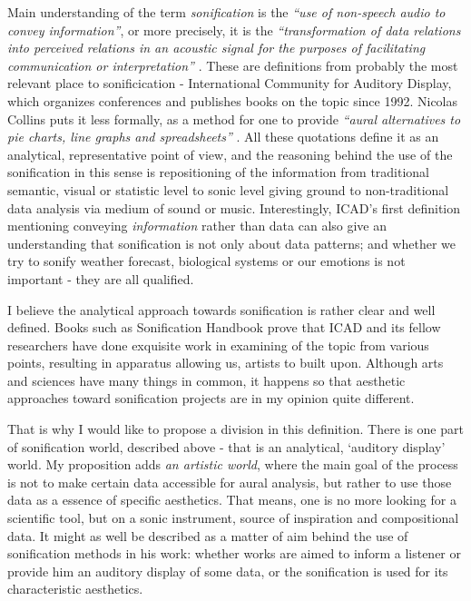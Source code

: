 \documentclass[12pt,a4paper,oneside]{report}
\begin{document}
Main understanding of the term \emph{sonification} is the \emph{``use of non-speech audio to convey information''}, or more precisely, it is the \emph{``transformation of data relations into perceived relations in an acoustic signal for the purposes of facilitating communication or interpretation''} \cite[p.~1]{Fitch}. These are definitions from probably the most relevant place to sonificication - International Community for Auditory Display, which organizes conferences and publishes books on the topic since 1992. Nicolas Collins puts it less formally, as a method for one to provide \emph{``aural alternatives to pie charts, line graphs and spreadsheets''} \cite[p.~7]{Collins2006}. All these quotations define it as an analytical, representative point of view, and the reasoning behind the use of the sonification in this sense is repositioning of the information from traditional semantic, visual or statistic level to sonic level giving ground to non-traditional data analysis via medium of sound or music. Interestingly, ICAD's first definition mentioning conveying \emph{information} rather than data can also give an understanding that sonification is not only about data patterns; and whether we try to sonify weather forecast, biological systems or our emotions is not important - they are all qualified.

I believe the analytical approach towards sonification is rather clear and well defined. Books such as Sonification Handbook \cite{Hermann2011} prove that ICAD and its fellow researchers have done exquisite work in examining of the topic from various points, resulting in apparatus allowing us, artists to built upon. Although arts and sciences have many things in common, it happens so that aesthetic approaches toward sonification projects are in my opinion quite different.


That is why I would like to propose a division in this definition. There is one part of sonification world, described above - that is an analytical, `auditory display' world. My proposition adds \emph{an artistic world}, where the main goal of the process is not to make certain data accessible for aural analysis, but rather to use those data as a essence of specific aesthetics. That means, one is no more looking for a scientific tool, but on a sonic instrument, source of inspiration and compositional data. It might as well be described as a matter of aim behind the use of sonification methods in his work: whether works are aimed to inform a listener or provide him an auditory display of some data, or the sonification is used for its characteristic aesthetics.
\end{document}

